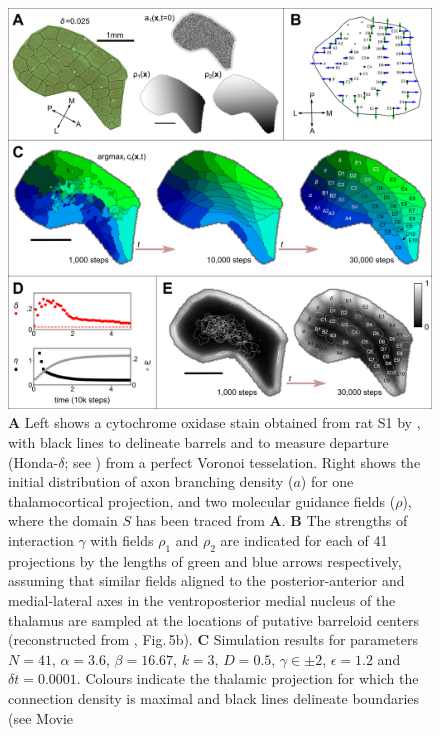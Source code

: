 \documentclass[9pt,lineno]{elife}
\newcommand{\cmnt}[1]{\textcolor{colcmnt}{#1}}
\newcommand{\MPone}[1]{\textcolor{colmpone}{#1}}
\newcommand{\MPtwo}[1]{\textcolor{colmptwo}{#1}}
\begin{document}
\begin{figure}
  \begin{fullwidth}
    \includegraphics[width=\linewidth]{./Fig1.png}
    \caption{\textbf{A} Left shows a cytochrome oxidase stain obtained from rat S1
      by \cite{zheng_signal_2001}, with black lines to delineate barrels and to
      measure departure (Honda-$\delta$; see \citealp{senft_mouse_1991}) from a
      perfect Voronoi tesselation. Right shows the initial distribution of axon
      branching density ($a$) for one thalamocortical projection, and two
      molecular guidance fields ($\rho$), \cmnt{where the domain $S$ has been
        traced from \textbf{A}}. \textbf{B} The strengths of interaction
      $\gamma$ with fields $\rho_1$ and $\rho_2$ are indicated for each of 41
      projections by the lengths of green and blue arrows respectively, assuming
      that similar fields aligned to the posterior-anterior and medial-lateral
      axes in the ventroposterior medial nucleus of the thalamus are sampled at
      the locations of putative barreloid centers (reconstructed from
      \citealp{haidarliu_size_2001}, \MPone{Fig.\,5b}). \textbf{C} Simulation results for parameters
      \MPtwo{$N=41$, $\alpha=3.6$, $\beta=16.67$, $k=3$, $D=0.5$, $\gamma\in\pm 2$,
      $\epsilon=1.2$} and $\delta{t}=0.0001$. Colours indicate the thalamic
      projection for which the connection density is maximal and black lines
      delineate boundaries (see Movie
}
\end{fullwidth}
\end{figure}
\end{document}
